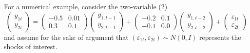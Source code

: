 \documentclass[12pt,fleqn]{article}
\newcommand{\vep}{\varepsilon}
\begin{document}
For a numerical example, consider the two-variable \VAR(2)
\begin{equation}
  \begin{pmatrix}
    y_{1t} \\ y_{2t}
  \end{pmatrix}
  =
  \begin{pmatrix}
    - 0.5 & 0.01 \\ 0.3 & 0.1
  \end{pmatrix}
  \begin{pmatrix}
    y_{1,t-1} \\ y_{2,t-1}
  \end{pmatrix}
  +
  \begin{pmatrix}
    -0.2 & 0.1 \\ -0.1 & 0.0
  \end{pmatrix}
  \begin{pmatrix}
    y_{1,t-2} \\ y_{2,t-2}
  \end{pmatrix}
  +
  \begin{pmatrix}
    \vep_{1t} \\ \vep_{2t}
  \end{pmatrix}
\end{equation}
and assume for the sake of argument that $(\vep_{1t},\vep_{2t}) \sim
N(0,I)$ represents the shocks of interest.
\end{document}
